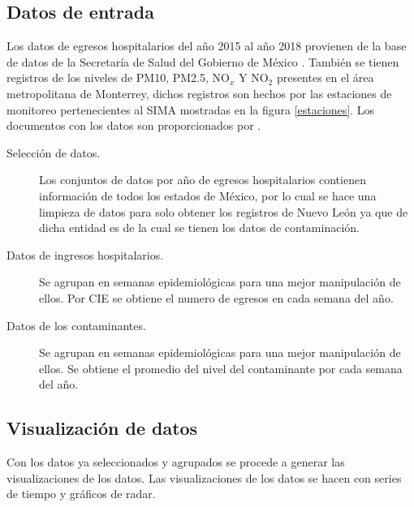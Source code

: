 \subsection{Datos de entrada}
Los datos de egresos hospitalarios del año 2015 al año 2018 provienen de la base de datos de la Secretaría de Salud del Gobierno de México \cite{f1}. También se tienen registros de los niveles de PM10, PM2.5, NO$_x$ Y NO$_2$ presentes en el área metropolitana de Monterrey, dichos registros son hechos por las estaciones de monitoreo pertenecientes al SIMA \cite{f2} mostradas en la figura \ref{estaciones}. Los documentos con los datos son proporcionados por \citet{f3}.

\begin{description}
\item [Selección de datos.] {Los conjuntos de datos por año de egresos hospitalarios contienen información de todos los estados de México, por lo cual se hace una limpieza de datos para solo obtener los registros de Nuevo León ya que de dicha entidad es de la cual se tienen los datos de contaminación.}
\item [Datos de ingresos hospitalarios.] {Se agrupan en semanas epidemiológicas para una mejor manipulación de ellos. Por CIE \citep{r9} se obtiene el numero de egresos en cada semana del año.}
\item [Datos de los contaminantes.] {Se agrupan en semanas epidemiológicas para una mejor manipulación de ellos. Se obtiene el promedio del nivel del contaminante por cada semana del año.}
\end{description}

\subsection{Visualización de datos}
Con los datos ya seleccionados y agrupados se procede a generar las visualizaciones de los datos. Las visualizaciones de los datos se hacen con series de tiempo y gráficos de radar.

